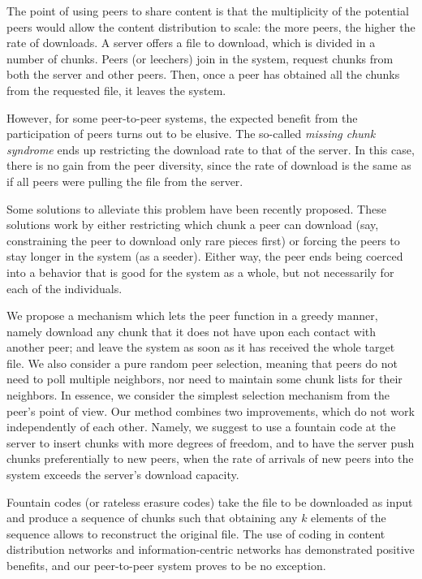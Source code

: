 \documentclass[11pt,conference]{IEEEtran}
\begin{document}
The point of using peers to share content is that the multiplicity of the potential peers would allow the content distribution to scale: the more peers, the higher the rate of downloads. A server offers a file to download, which is divided in a number of chunks. Peers (or leechers) join in the system, request chunks from both the server and other peers. Then, once a peer has obtained all the chunks from the requested file, it leaves the system.

However, for some peer-to-peer systems, the expected benefit from the participation of peers turns out to be elusive\cite{Hajek2010Missing}\cite{Mathieu2006Missing}. The so-called {\em missing chunk syndrome} ends up restricting the download rate to that of the server. In this case, there is no gain from the peer diversity, since the rate of download is the same as if all peers were pulling the file from the server.

Some solutions to alleviate this problem have been recently proposed\cite{Oguz:EECS-2012-6}\cite{Zhu2011Stability}\cite{Zhou2011Stability}. These solutions work by either restricting which chunk a peer can download (say, constraining the peer to download only rare pieces first) or forcing the peers to stay longer in the system (as a seeder). Either way, the peer ends being coerced into a behavior that is good for the system as a whole, but not necessarily for each of the individuals.

We propose a mechanism which lets the peer function in a greedy manner, namely download any chunk that it does not have upon each contact with another peer; and leave the system as soon as it has received the whole target file. We also consider a pure random peer selection, meaning that peers do not need to poll multiple neighbors, nor need to maintain some chunk lists for their neighbors. In essence, we consider the simplest selection mechanism from the peer's point of view. Our method combines two improvements, which do not work independently of each other. Namely, we suggest to use a fountain code\cite{Byers:1998} at the server to insert chunks with more degrees of freedom, and to have the server push chunks preferentially to new peers, when the rate of arrivals of new peers into the system exceeds the server's download capacity.

Fountain codes (or rateless erasure codes) take the file to be downloaded as input and produce a sequence of chunks such that obtaining any $k$ elements of the sequence allows to reconstruct the original file. The use of coding in content distribution networks\cite{Gkantsidis2005Network} and information-centric networks\cite{Montpetit2011Network} has demonstrated positive benefits, and our peer-to-peer system proves to be no exception.
\end{document}
